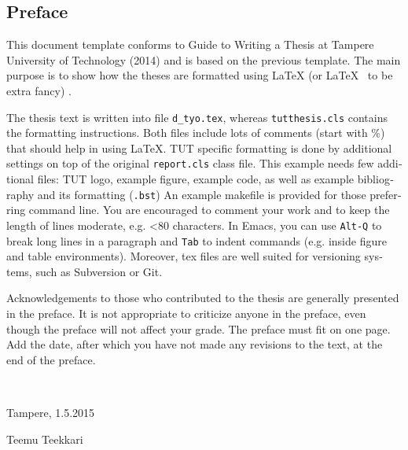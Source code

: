 \documentclass[12pt,a4paper,english]{tutthesis}
\begin{document}
\begin{otherlanguage}{english} %
\makeatother %

%
%
\chapter*{Preface}

This document template conforms to Guide to Writing a Thesis at
Tampere University of Technology (2014) and is based on the previous
template. The main purpose is to show how the theses are formatted
using LaTeX (or \LaTeX ~ to be extra fancy) .


The thesis text is written into file \texttt{d\_tyo.tex}, whereas
\texttt{tutthesis.cls} contains the formatting instructions. Both
files include lots of comments (start with \%) that should help in
using LaTeX. TUT specific formatting is done by additional settings on
top of the original \texttt{report.cls} class file. This example needs
few additional files: TUT logo, example figure, example code, as well
as example bibliography and its formatting (\texttt{.bst}) An example
makefile is provided for those preferring command line. You are
encouraged to comment your work and to keep the length of lines
moderate, e.g. <80 characters. In Emacs, you can use \texttt{Alt-Q} to
break long lines in a paragraph and \texttt{Tab} to indent commands
(e.g. inside figure and table environments). Moreover, tex files are
well suited for versioning systems, such as Subversion or Git.  

Acknowledgements to those who contributed to the thesis are generally
presented in the preface. It is not appropriate to criticize anyone in
the preface, even though the preface will not affect your grade. The
preface must fit on one page. Add the date, after which you have not
made any revisions to the text, at the end of the preface.

~ 

Tampere, 1.5.2015
~


Teemu Teekkari
%
%

\renewcommand\contentsname{Table of Contents} %
\setcounter{tocdepth}{3}                      %


\end{otherlanguage}
\end{document}
